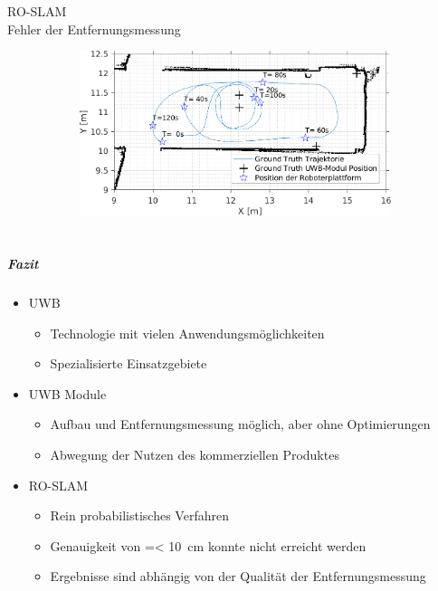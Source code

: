 \documentclass{beamer}
\begin{document}
\begin{frame}{RO-SLAM\\\normalsize{Fehler der Entfernungsmessung}}
\begin{figure}
\begin{subfigure}{0.6\linewidth}
		\end{subfigure}
		\hfill
		\begin{subfigure}{0.38\linewidth}
			\centering
			\includegraphics[width=\linewidth]{2018-02-08-12-33-53_beacon_range_error2}
		\end{subfigure}
	\end{figure}
\end{frame}


%
%
\part{}
\begin{frame}
	\frametitle{Fazit}
	\begin{itemize}
		\item<1-> UWB
			\begin{itemize}
				\item Technologie mit vielen Anwendungsmöglichkeiten
				\item Spezialisierte Einsatzgebiete
			\end{itemize}
		\item<2-> UWB Module
			\begin{itemize}
				\item Aufbau und Entfernungsmessung möglich, aber ohne Optimierungen
				\item Abwegung der Nutzen des kommerziellen Produktes
			\end{itemize}
		\item<3-> RO-SLAM
			\begin{itemize}
				\item Rein probabilistisches Verfahren
				\item Genauigkeit von =< \SI{10}{\centi\meter} konnte nicht erreicht werden
				\item Ergebnisse sind abhängig von der Qualität der Entfernungsmessung
			\end{itemize}
	\end{itemize}
\end{frame}
\end{document}
